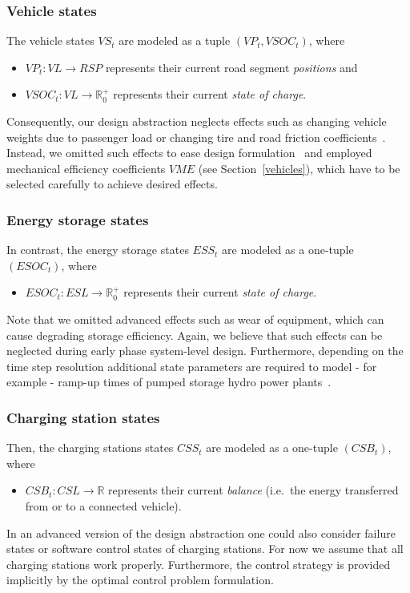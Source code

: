 \subsubsection{Vehicle states}
\label{states_vehicles}

The vehicle states $VS_t$ are modeled as a tuple $(VP_t, VSOC_t)$, where
\begin{itemize}
	\item $VP_t: VL \rightarrow RSP$ represents their current road segment \textit{positions} and
	\item $VSOC_t: VL \rightarrow \mathbb{R}_0^+$ represents their current \textit{state of charge}.
\end{itemize}
Consequently, our design abstraction neglects effects such as changing vehicle weights due to passenger load or changing tire and road friction coefficients~\cite{imine2006road}.
Instead, we omitted such effects to ease design formulation~\cite{gao2007modeling} and employed mechanical efficiency coefficients $VME$ (see Section~\ref{vehicles}), which have to be selected carefully to achieve desired effects.

\subsubsection{Energy storage states}
\label{states_storages}

In contrast, the energy storage states $ESS_t$ are modeled as a one-tuple $(ESOC_t)$, where
\begin{itemize}
	\item $ESOC_t: ESL \rightarrow \mathbb{R}_0^+$ represents their current \textit{state of charge}. 
\end{itemize}
Note that we omitted advanced effects such as wear of equipment, 
which can cause degrading storage efficiency. Again, we believe that such effects can be neglected during early phase system-level design. Furthermore, depending on the time step resolution additional state parameters are required to model - for example - ramp-up times of pumped storage hydro power plants~\cite{Garcia2008}.

\subsubsection{Charging station states}
\label{states_stations}

Then, the charging stations states $CSS_t$ are modeled as a one-tuple $(CSB_t)$, where
\begin{itemize}
	\item $CSB_t: CSL \rightarrow \mathbb{R}$ represents their current \textit{balance} (i.e.\ the energy transferred from or to a connected vehicle).
\end{itemize}
In an advanced version of the design abstraction one could also consider failure states or software control states of charging stations. For now we assume that all charging stations work properly. Furthermore, the control strategy is provided implicitly by the optimal control problem formulation.

